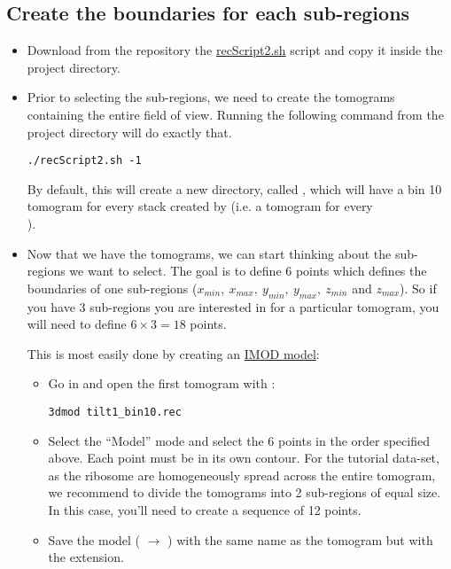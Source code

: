 \subsection{Create the boundaries for each sub-regions}
\begin{itemize}
    \item Download from the repository the \href{https://github.com/bHimes/emClarity}{recScript2.sh} script and copy it inside the project directory.
    
    \item Prior to selecting the sub-regions, we need to create the tomograms containing the entire field of view. Running the following command from the project directory will do exactly that.
\begin{lstlisting}
./recScript2.sh -1
\end{lstlisting}
    By default, this will create a new directory, called , which will have a bin 10 tomogram for every stack created by  (i.e. a tomogram for every\\ ). 
    
    \item Now that we have the tomograms, we can start thinking about the sub-regions we want to select. The goal is to define 6 points which defines the boundaries of one sub-regions ($x_{min},\ x_{max},\ y_{min},\ y_{max},\ z_{min}$ and $z_{max}$). So if you have 3 sub-regions you are interested in for a particular tomogram, you will need to define $6\times3=18$ points.
    
    This is most easily done by creating an \href{https://bio3d.colorado.edu/imod/doc/binspec.html}{\textcolor{myred}{IMOD model}}:
    \begin{itemize}
        \item Go in  and open the first tomogram with {\threedmod}:
\begin{lstlisting}
3dmod tilt1_bin10.rec
\end{lstlisting}
        \item Select the ``Model'' mode and select the 6 points in the order specified above. Each point must be in its own contour. For the tutorial data-set, as the ribosome are homogeneously spread across the entire tomogram, we recommend to divide the tomograms into 2 sub-regions of equal size. In this case, you'll need to create a sequence of 12 points.
        
        \item Save the model ( $\rightarrow$ ) with the same name as the tomogram but with the  extension.
        

\end{itemize}
\end{itemize}
